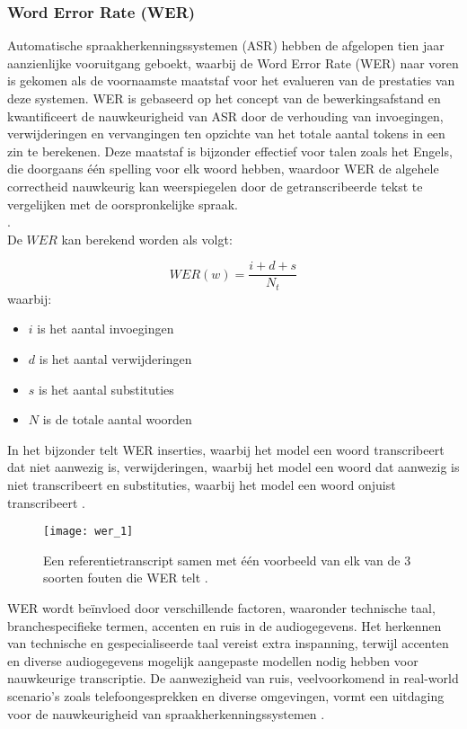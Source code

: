 \subsubsection{Word Error Rate (WER)}
Automatische spraakherkenningssystemen (ASR) hebben de afgelopen tien jaar aanzienlijke vooruitgang geboekt, waarbij de Word Error Rate (WER) naar voren is gekomen als de voornaamste maatstaf voor het evalueren van de prestaties van deze systemen. WER is gebaseerd op het concept van de bewerkingsafstand en kwantificeert de nauwkeurigheid van ASR door de verhouding van invoegingen, verwijderingen en vervangingen ten opzichte van het totale aantal tokens in een zin te berekenen. Deze maatstaf is bijzonder effectief voor talen zoals het Engels, die doorgaans één spelling voor elk woord hebben, waardoor WER de algehele correctheid nauwkeurig kan weerspiegelen door de getranscribeerde tekst te vergelijken met de oorspronkelijke spraak.\\
\autocite{Raghavan2022}.
\\De \(WER\) kan berekend worden als volgt:

\begin{equation}
   WER(w) = \frac{i + d + s}{N_t}
\end{equation}
waarbij:
\begin{itemize}
    \item \(i\) is het aantal invoegingen
    \item \(d\) is het aantal verwijderingen
    \item \(s\) is het aantal substituties
    \item \(N\) is de totale aantal woorden
\end{itemize}

In het bijzonder telt WER inserties, waarbij het model een woord transcribeert dat niet aanwezig is, verwijderingen, waarbij het model een woord dat aanwezig is niet transcribeert en substituties, waarbij het model een woord onjuist transcribeert
\autocite{OConnor2023}.
\begin{figure}[htbp]
    \centering
    \texttt{[image: wer\_1]}
    \caption{Een referentietranscript samen met één voorbeeld van elk van de 3 soorten fouten die WER telt \autocite{OConnor2023}.}
    \label{fig:WER count}
\end{figure}

WER wordt beïnvloed door verschillende factoren, waaronder technische taal, branchespecifieke termen, accenten en ruis in de audiogegevens. Het herkennen van technische en gespecialiseerde taal vereist extra inspanning, terwijl accenten en diverse audiogegevens mogelijk aangepaste modellen nodig hebben voor nauwkeurige transcriptie. De aanwezigheid van ruis, veelvoorkomend in real-world scenario's zoals telefoongesprekken en diverse omgevingen, vormt een uitdaging voor de nauwkeurigheid van spraakherkenningssystemen \autocite{Gevirtz2018}.

